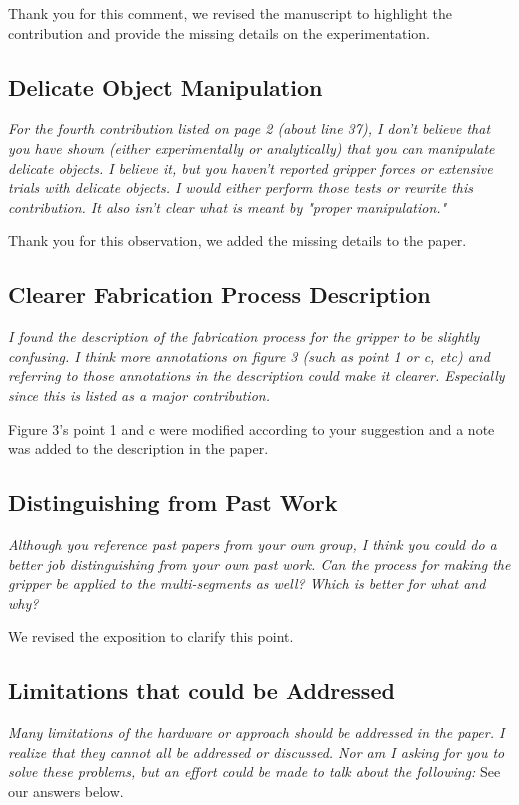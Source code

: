 \documentclass[letterpaper, 10 pt, twocolumn, conference]{article}
\begin{document}
Thank you for this comment, we revised the manuscript to highlight the contribution and provide the missing details on the experimentation. 

\subsection{Delicate Object Manipulation}
\textit{For the fourth contribution listed on page 2 (about line 37), I don't believe that you have shown (either experimentally or analytically) that you can manipulate delicate objects. I believe it, but you haven't reported gripper forces or extensive trials with delicate objects. I would either perform those tests or rewrite this contribution. It also isn't clear what is meant by "proper manipulation."}

Thank you for this observation, we added the missing details to the paper. 

\subsection{Clearer Fabrication Process Description}
\textit{I found the description of the fabrication process for the gripper to be slightly confusing. I think more annotations on figure 3 (such as point 1 or c, etc) and referring to those annotations in the description could make it clearer. Especially since this is listed as a major contribution.}

Figure 3’s point 1 and c were modified according to your suggestion and a note was added to the description in the paper.

\subsection{Distinguishing from Past Work}
\textit{Although you reference past papers from your own group, I think you could do a better job distinguishing from your own past work. Can the process for making the gripper be applied to the multi-segments as well? Which is better for what and why?}

We revised the exposition to clarify this point. 

\subsection{Limitations that could be Addressed}
\textit{Many limitations of the hardware or approach should be addressed in the paper. I realize that they cannot all be addressed or discussed. Nor am I asking for you to solve these problems, but an effort could be made to talk about the following:}
See our answers below.
\end{document}
